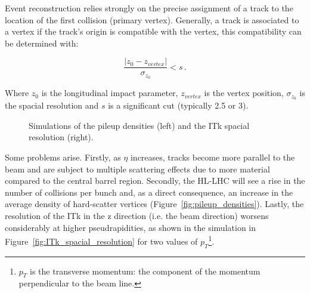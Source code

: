 Event reconstruction relies strongly on the precise assignment of a track to the location of the first collision (primary vertex). %
Generally, a track is associated to a vertex if the track's origin is compatible with the vertex, this compatibility can be determined with:

\begin{equation}\label{eq:compatibility_vertex}
    \frac{\left|z_0 - z_{vertex}\right|}{\sigma_{z_0}} < s \,.
\end{equation}
 
Where \(z_0\) is the longitudinal impact parameter, \(z_{vertex}\) is the vertex position, \(\sigma_{z_0}\) is the spacial resolution and \(s\) is a significant cut (typically 2.5 or 3)\cite{cernTechnicalDesign}. 

\begin{figure}[h!tbp]
    \centering
    \hfill
    \centering
    \caption{Simulations of the pileup densities (left) and the ITk spacial resolution (right).}
\end{figure}

Some problems arise. 
Firstly, as \(\eta\) increases, tracks become more parallel to the beam and are subject to multiple scattering effects due to more material compared to the central barrel region. Secondly, the HL-LHC will see a rise in the number of collisions per bunch %
 and, as a direct consequence, an increase in the average density of hard-scatter vertices (Figure~\ref{fig:pileup_densities}). Lastly, the resolution of the ITk in the z direction (i.e. the beam direction) worsens considerably at higher pseudrapidities, as shown in the simulation in Figure~\ref{fig:ITk_spacial_resolution} for two values of \(p_T\)\footnote{\(p_T\) is the transverse momentum: the component of the momentum perpendicular to the beam line.}.

